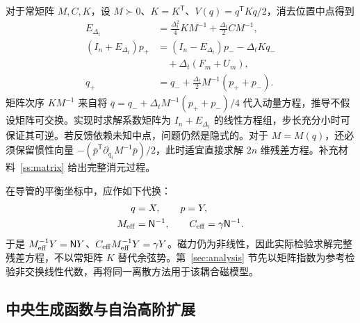 对于常矩阵 $M,C,K$，设 $M\succ0$、$K=K^{\mathsf T}$、$V(q)=q^{\mathsf T}Kq/2$，消去位置中点得到
\begin{equation}\label{struct:matrix-elimination}
\begin{aligned}
 E_{\Delta_t}&=\tfrac{\Delta_t^2}{4}KM^{-1}
                         +\tfrac{\Delta_t}{2}CM^{-1},\\
 (I_n+E_{\Delta_t})p_+
    &=(I_n-E_{\Delta_t})p_--\Delta_tKq_-\\
    &\quad+\Delta_t(F_m+U_m),\\
 q_+&=q_-+\tfrac{\Delta_t}{2}M^{-1}(p_++p_-).
\end{aligned}
\end{equation}
矩阵次序 $KM^{-1}$ 来自将 $\bar q=q_-+\Delta_tM^{-1}(p_++p_-)/4$ 代入动量方程，推导不假设矩阵可交换。实现时求解系数矩阵为 $I_n+E_{\Delta_t}$ 的线性方程组，步长充分小时可保证其可逆。若反馈依赖未知中点，问题仍然是隐式的。对于 $M=M(q)$，还必须保留惯性向量 $-(\bar p^{\mathsf T}\partial_{q_i}M^{-1}\bar p)/2$，此时适宜直接求解 $2n$ 维残差方程。补充材料~\ref{ss:matrix} 给出完整消元过程。

在导管的平衡坐标中，应作如下代换：
\begin{equation}\label{struct:effective-matrices}
\begin{aligned}
 q&=X,\qquad p=Y,\\
 M_{\rm eff}&=\mathsf N^{-1},\qquad
 C_{\rm eff}=\gamma\mathsf N^{-1}.
\end{aligned}
\end{equation}
于是 $M_{\rm eff}^{-1}Y=\mathsf N Y$、$C_{\rm eff}M_{\rm eff}^{-1}Y=\gamma Y$。磁力仍为非线性，因此实际检验求解完整残差方程，不以常矩阵 $K$ 替代余弦势。第~\ref{sec:analysis} 节先以矩阵指数为参考检验非交换线性代数，再将同一离散方法用于该耦合磁模型。

\subsection{中央生成函数与自治高阶扩展}
\label{struct:schemes}

